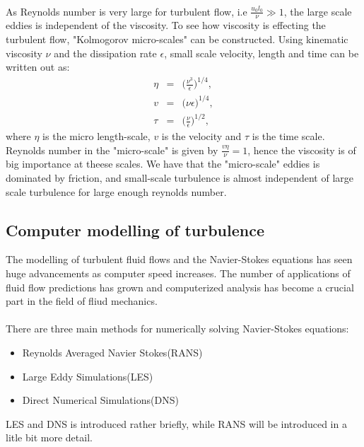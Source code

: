 \documentclass[a4paper, 12pt]{report}
\begin{document}
\\
As Reynolds number is very large for turbulent flow, i.e $\frac{u_0l_0}{\nu} \gg 1$, the large scale eddies is independent of the viscosity. To see how viscosity is effecting the turbulent flow, "Kolmogorov micro-scales" can be constructed. Using kinematic viscosity $\nu$ and the dissipation rate $\epsilon$, small scale velocity, length and time can be written out as:
\begin{eqnarray}
\label{eqn:microLength}
\eta &=& \big(\frac{\nu^3}{\epsilon}\big)^{1/4}, \\
\label{eqn:microVelocity}
v &=& \big(\nu\epsilon\big)^{1/4}, \\
\label{eqn:microTime}
\tau &=& \big(\frac{\nu}{\epsilon}\big)^{1/2}, 
\end{eqnarray}  
where  $\eta$ is the micro length-scale, $v$ is the velocity and $\tau$ is the time scale. Reynolds number in the "micro-scale" is given by $\frac{v\eta}{\nu} = 1$, hence the viscosity is of big importance at theese scales. We have that the "micro-scale" eddies is dominated by friction, and small-scale turbulence is almost independent of large scale turbulence for large enough reynolds number.

\subsection{Computer modelling of turbulence}
The modelling of turbulent fluid flows and the Navier-Stokes equations has seen huge advancements as computer speed increases. The number of applications of fluid flow predictions has grown and computerized analysis has become a crucial part in the field of fliud mechanics.\\
\\
There are three main methods for numerically solving Navier-Stokes equations:
\begin{itemize}
	\item Reynolds Averaged Navier Stokes(RANS)
	\item  Large Eddy Simulations(LES)
	\item  Direct Numerical Simulations(DNS)
\end{itemize}
LES and DNS is introduced rather briefly, while RANS will be introduced in a litle bit more detail.
\end{document}

